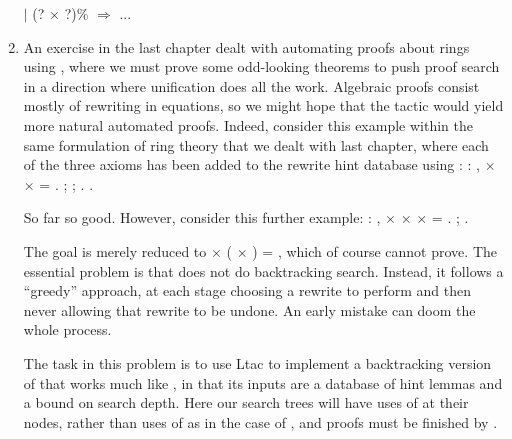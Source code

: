 \documentclass[12pt]{report}
\begin{document}
\begin{enumerate}
\ensuremath{|} (? \ensuremath{\times} ?)\% \ensuremath{\Rightarrow} ...


\item An exercise in the last chapter dealt with automating proofs about rings using , where we must prove some odd-looking theorems to push proof search in a direction where unification does all the work.  Algebraic proofs consist mostly of rewriting in equations, so we might hope that the  tactic would yield more natural automated proofs.  Indeed, consider this example within the same formulation of ring theory that we dealt with last chapter, where each of the three axioms has been added to the rewrite hint database  using  :
\coqdoceol
\coqdocemptyline
\coqdocnoindent
{}  : \coqdockw{\ensuremath{\forall}}  ,  \ensuremath{\times}  \ensuremath{\times}   = .\coqdoceol
\coqdocindent{1.00em}
;   ; .\coqdoceol
\coqdocnoindent
{}.

\coqdocemptyline


So far so good.  However, consider this further example:
\coqdoceol
\coqdocemptyline
\coqdocnoindent
{}  : \coqdockw{\ensuremath{\forall}} ,  \ensuremath{\times}  \ensuremath{\times}   \ensuremath{\times}   = .\coqdoceol
\coqdocindent{1.00em}
;   .

\coqdocemptyline


The goal is merely reduced to  \ensuremath{\times} (  \ensuremath{\times}  ) = , which of course  cannot prove.  The essential problem is that  does not do backtracking search.  Instead, it follows a ``greedy'' approach, at each stage choosing a rewrite to perform and then never allowing that rewrite to be undone.  An early mistake can doom the whole process.


The task in this problem is to use Ltac to implement a backtracking version of  that works much like , in that its inputs are a database of hint lemmas and a bound on search depth.  Here our search trees will have uses of  at their nodes, rather than uses of  as in the case of , and proofs must be finished by .



\end{enumerate}
\end{document}
